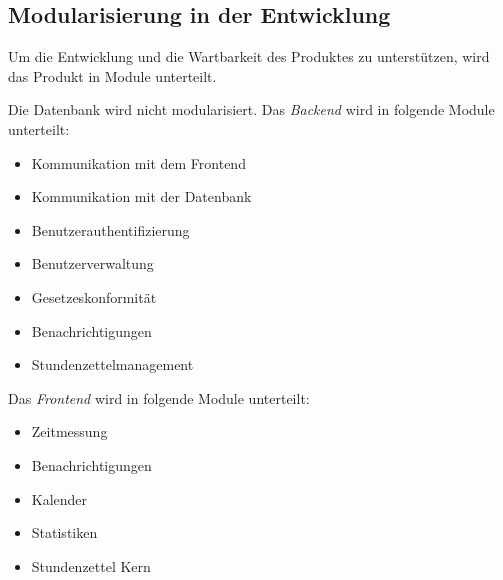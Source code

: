 \subsection{Modularisierung in der Entwicklung}

\begin{requirements}
     Um die Entwicklung und die Wartbarkeit des Produktes zu unterstützen, wird das Produkt in Module unterteilt.
    \begin{requirements}
         Die Datenbank wird nicht modularisiert.
         Das \emph{Backend} wird in folgende Module unterteilt:
            \begin{itemize}
                \item Kommunikation mit dem Frontend
                \item Kommunikation mit der Datenbank
                \item Benutzerauthentifizierung
                \item Benutzerverwaltung
                \item Gesetzeskonformität
                \item Benachrichtigungen
                \item Stundenzettelmanagement
            \end{itemize}
         Das \emph{Frontend} wird in folgende Module unterteilt:
            \begin{itemize}
                \item Zeitmessung
                \item Benachrichtigungen
                \item Kalender
                \item Statistiken
                \item Stundenzettel Kern
            \end{itemize}
    \end{requirements}
\end{requirements}

